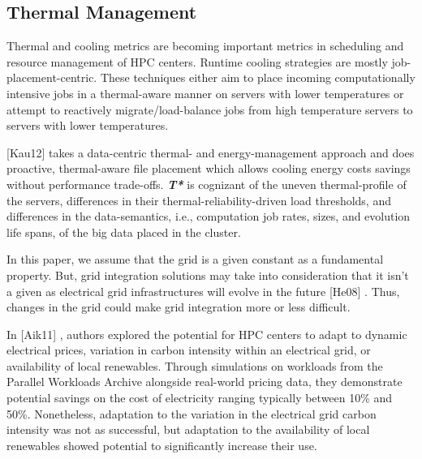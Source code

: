 \subsection{Thermal Management}
Thermal and cooling metrics are becoming important metrics in scheduling and
resource management of HPC centers. Runtime cooling strategies are mostly
job-placement-centric. These techniques either aim to place incoming
computationally intensive jobs in a thermal-aware manner on servers with
lower temperatures or attempt to reactively migrate/load-balance jobs from
high temperature servers to servers with lower temperatures.

\cite{kaushik_t*:_2012}
[Kau12]
 takes a data-centric thermal- and
energy-management approach and does proactive, thermal-aware file placement
which allows cooling energy costs savings without performance trade-offs. \textbf{\textit{T* }} 
is cognizant of the uneven thermal-profile of the servers, differences in
their thermal-reliability-driven load thresholds, and differences in the
data-semantics, i.e., computation job rates, sizes, and evolution life
spans, of the big data placed in the cluster.

In this paper, we assume that the grid is a given constant as a fundamental
property. But, grid integration solutions may take into consideration that
it isn't a given as electrical grid infrastructures will evolve in the
future 
\cite{he_architecture_2008}
[He08]
. Thus, changes in the grid could make grid integration more or
less difficult.


In 
\cite{aikema_electrical_2011}
[Aik11] , authors explored the potential for HPC centers to adapt to
dynamic electrical prices, variation in carbon intensity within an
electrical grid, or availability of local renewables. Through simulations on workloads from the Parallel Workloads Archive alongside
real-world pricing data, they demonstrate potential savings on the cost of
electricity ranging typically between 10{\%} and 50{\%}. Nonetheless, adaptation to
the variation in the electrical grid carbon intensity was not as successful,
but adaptation to the availability of local renewables showed potential to
significantly increase their use.